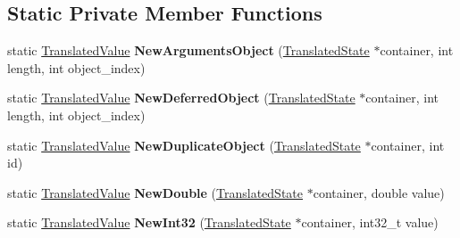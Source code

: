 \subsection*{Static Private Member Functions}
\begin{DoxyCompactItemize}
\item 
static \hyperlink{classv8_1_1internal_1_1_translated_value}{Translated\+Value} {\bfseries New\+Arguments\+Object} (\hyperlink{classv8_1_1internal_1_1_translated_state}{Translated\+State} $\ast$container, int length, int object\+\_\+index)\hypertarget{classv8_1_1internal_1_1_translated_value_a24cba75907eb3824f82ee77277143fc9}{}\label{classv8_1_1internal_1_1_translated_value_a24cba75907eb3824f82ee77277143fc9}

\item 
static \hyperlink{classv8_1_1internal_1_1_translated_value}{Translated\+Value} {\bfseries New\+Deferred\+Object} (\hyperlink{classv8_1_1internal_1_1_translated_state}{Translated\+State} $\ast$container, int length, int object\+\_\+index)\hypertarget{classv8_1_1internal_1_1_translated_value_ae2e00c571a1c13a2771f68f33c5d26e7}{}\label{classv8_1_1internal_1_1_translated_value_ae2e00c571a1c13a2771f68f33c5d26e7}

\item 
static \hyperlink{classv8_1_1internal_1_1_translated_value}{Translated\+Value} {\bfseries New\+Duplicate\+Object} (\hyperlink{classv8_1_1internal_1_1_translated_state}{Translated\+State} $\ast$container, int id)\hypertarget{classv8_1_1internal_1_1_translated_value_a33dd82e9fa74d9b0256bbaa37d02e273}{}\label{classv8_1_1internal_1_1_translated_value_a33dd82e9fa74d9b0256bbaa37d02e273}

\item 
static \hyperlink{classv8_1_1internal_1_1_translated_value}{Translated\+Value} {\bfseries New\+Double} (\hyperlink{classv8_1_1internal_1_1_translated_state}{Translated\+State} $\ast$container, double value)\hypertarget{classv8_1_1internal_1_1_translated_value_a2318865c354004bbfad58f069bdaba6e}{}\label{classv8_1_1internal_1_1_translated_value_a2318865c354004bbfad58f069bdaba6e}

\item 
static \hyperlink{classv8_1_1internal_1_1_translated_value}{Translated\+Value} {\bfseries New\+Int32} (\hyperlink{classv8_1_1internal_1_1_translated_state}{Translated\+State} $\ast$container, int32\+\_\+t value)\hypertarget{classv8_1_1internal_1_1_translated_value_a7ba18659686ac0a46aa58e42fb46b510}{}\label{classv8_1_1internal_1_1_translated_value_a7ba18659686ac0a46aa58e42fb46b510}


\end{DoxyCompactItemize}
